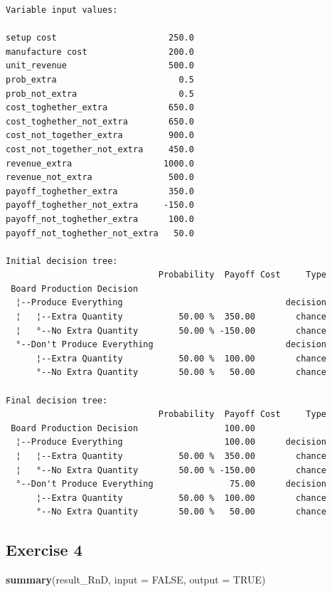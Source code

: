 \documentclass[]{article}
\newenvironment{Shaded}{\begin{snugshade}}{\end{snugshade}}
\newcommand{\KeywordTok}[1]{\textcolor[rgb]{0.13,0.29,0.53}{\textbf{#1}}}
\newcommand{\DataTypeTok}[1]{\textcolor[rgb]{0.13,0.29,0.53}{#1}}
\newcommand{\OtherTok}[1]{\textcolor[rgb]{0.56,0.35,0.01}{#1}}
\newcommand{\NormalTok}[1]{#1}
\begin{document}
\begin{verbatim}
Variable input values:
                                     
setup cost                      250.0
manufacture cost                200.0
unit_revenue                    500.0
prob_extra                        0.5
prob_not_extra                    0.5
cost_toghether_extra            650.0
cost_toghether_not_extra        650.0
cost_not_together_extra         900.0
cost_not_together_not_extra     450.0
revenue_extra                  1000.0
revenue_not_extra               500.0
payoff_toghether_extra          350.0
payoff_toghether_not_extra     -150.0
payoff_not_toghether_extra      100.0
payoff_not_toghether_not_extra   50.0

Initial decision tree:
                              Probability  Payoff Cost     Type
 Board Production Decision                                     
  ¦--Produce Everything                                decision
  ¦   ¦--Extra Quantity           50.00 %  350.00        chance
  ¦   °--No Extra Quantity        50.00 % -150.00        chance
  °--Don't Produce Everything                          decision
      ¦--Extra Quantity           50.00 %  100.00        chance
      °--No Extra Quantity        50.00 %   50.00        chance

Final decision tree:
                              Probability  Payoff Cost     Type
 Board Production Decision                 100.00              
  ¦--Produce Everything                    100.00      decision
  ¦   ¦--Extra Quantity           50.00 %  350.00        chance
  ¦   °--No Extra Quantity        50.00 % -150.00        chance
  °--Don't Produce Everything               75.00      decision
      ¦--Extra Quantity           50.00 %  100.00        chance
      °--No Extra Quantity        50.00 %   50.00        chance
\end{verbatim}

\subsection{Exercise 4}\label{exercise-4}

\begin{Shaded}
\begin{Highlighting}[]
\KeywordTok{summary}\NormalTok{(result_RnD, }\DataTypeTok{input =} \OtherTok{FALSE}\NormalTok{, }\DataTypeTok{output =} \OtherTok{TRUE}\NormalTok{)}
\end{Highlighting}
\end{Shaded}
\end{document}
